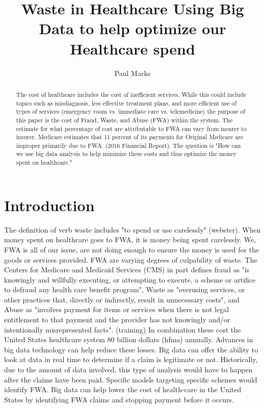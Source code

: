 \documentclass[sigconf]{acmart}
\begin{document}
\title{Waste in Healthcare
Using Big Data to help optimize our Healthcare spend}


\author{Paul Marks}


\begin{abstract}
The cost of healthcare includes the cost of inefficient services.  While this could include topics such as misdiagnosis, less effective treatment plans, and more efficient use of types of services (emergency room vs. immediate care vs. telemedicine) the purpose of this paper is the cost of Fraud, Waste, and Abuse (FWA) within the system.  The estimate for what percentage of cost are attributable to FWA can vary from insurer to insurer.  Medicare estimates that 11 percent of its payments for Original Medicare are improper primarily due to FWA.  (2016 Financial Report).   The question is "How can we use big data analysis to help minimize these costs and thus optimize the money spent on healthcare."
\end{abstract}



\maketitle

\section{Introduction}

The definition of verb waste includes "to spend or use carelessly" (webster).  When money spent on healthcare goes to FWA, it is money being spent carelessly.  We, FWA is all of our issue, are not doing enough to ensure the money is used for the goods or services provided.  FWA are varying degrees of culpability of waste.  The Centers for Medicare and Medicaid Services (CMS) in part defines fraud as "is knowingly and willfully executing, or attempting to execute, a scheme or artifice to defraud any health care benefit program", Waste as "overusing services, or other practices that, directly or indirectly, result in unnecessary costs", and Abuse as "involves payment for items or services when there is not legal entitlement to that payment and the provider has not knowingly and/or intentionally misrepresented facts".  (training)  In combination these cost the United States healthcare system 80 billion dollars (hfma) annually.  
Advances in big data technology can help reduce these losses.  Big data can offer the ability to look at data in real time to determine if a claim is legitimate or not.  Historically, due to the amount of data involved, this type of analysis would have to happen after the claims have been paid.  Specific models targeting specific schemes would identify FWA.  Big data can help lower the cost of health-care in the United States by identifying FWA claims and stopping payment before it occurs. 
\end{document}
